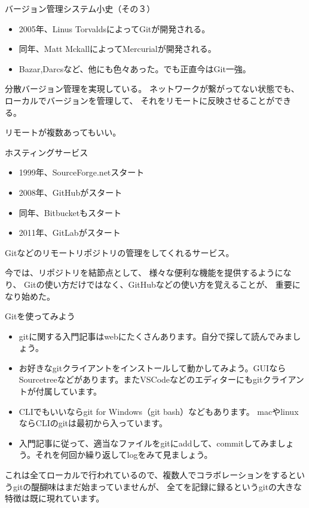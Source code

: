 \documentclass[12pt, unicode]{beamer}
\begin{document}
\begin{frame}{バージョン管理システム小史（その３）}
\begin{itemize}
\item 2005年、Linus TorvaldsによってGitが開発される。
\item 同年、Matt MckallによってMercurialが開発される。
\item Bazar,Darcsなど、他にも色々あった。でも正直今はGit一強。
\end{itemize}

分散バージョン管理を実現している。
ネットワークが繋がってない状態でも、
ローカルでバージョンを管理して、
それをリモートに反映させることができる。

リモートが複数あってもいい。

\end{frame}
\begin{frame}{ホスティングサービス}
\begin{itemize}
\item 1999年、SourceForge.netスタート
\item 2008年、GitHubがスタート
\item 同年、Bitbucketもスタート
\item 2011年、GitLabがスタート
\end{itemize}

Gitなどのリモートリポジトリの管理をしてくれるサービス。

今では、リポジトリを結節点として、
様々な便利な機能を提供するようになり、
Gitの使い方だけではなく、GitHubなどの使い方を覚えることが、
重要になり始めた。


\end{frame}
\begin{frame}{Gitを使ってみよう}

\begin{itemize}
\item gitに関する入門記事はwebにたくさんあります。自分で探して読んでみましょう。
\item お好きなgitクライアントをインストールして動かしてみよう。GUIならSourcetreeなどがあります。またVSCodeなどのエディターにもgitクライアントが付属しています。
\item CLIでもいいならgit for Windows（git bash）などもあります。
macやlinuxならCLIのgitは最初から入っています。
\item 入門記事に従って、適当なファイルをgitにaddして、commitしてみましょう。それを何回か繰り返してlogをみて見ましょう。
\end{itemize}
これは全てローカルで行われているので、複数人でコラボレーションをするというgitの醍醐味はまだ始まっていませんが、
全てを記録に録るというgitの大きな特徴は既に現れています。
\end{frame}
\end{document}
